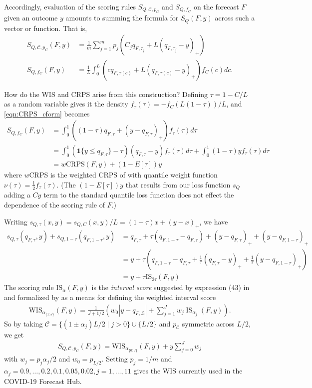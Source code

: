 \documentclass{article}
\begin{document}
Accordingly, evaluation of the scoring rules $S_{Q,\mathcal{C}, p_C}$ and $S_{Q,f_C}$ on the forecast $F$ given an outcome $y$ amounts to summing the formula for $S_Q(F,y)$ across such a vector or function. That is,
\begin{align}
S_{Q,\mathcal{C}, p_C}(F,y) &= \frac{1}{m}\sum_{j=1}^{m}p_j(C_j q_{F,\tau_j} + L(q_{F,\tau_j} - y)_+) \\
S_{Q, f_C}(F,y) &= \frac{1}{L}\int_{0}^{L}(cq_{F,\tau(c)} + L(q_{F,\tau(c)} - y)_+) f_C(c)dc. \label{eqn:CRPS_cform}
\end{align}

How do the WIS and CRPS arise from this construction? Defining $\tau = 1-C/L$ as a random variable gives it the density 
$f_{\tau}(\tau) = -f_C\left(L(1-\tau)\right)/L$, 
and \eqref{eqn:CRPS_cform} becomes 
\begin{align}
S_{Q, f_C}(F,y) &= \int_{0}^{1}((1-\tau)q_{F,\tau} + (y-q_{F,\tau})_{+})f_{\tau}(\tau)d\tau \\
&= \int_{0}^{1}(\mathbf{1}\{y \leq q_{F,\tau}\}-\tau)(q_{F,\tau} - y)f_{\tau}(\tau)d\tau + \int_{0}^{1}(1-\tau)y f_{\tau}(\tau)d\tau \\
&= w\mathrm{CRPS}(F,y) + (1-E[\tau])y
\end{align}
where $w$CRPS is the weighted CRPS of \cite{gneiting2011weightedScoringRules} with quantile weight function $\nu(\tau) = \frac{1}{2}f_{\tau}(\tau)$. 
(The $(1-E[\tau])y$ that results from our loss function $s_Q$ adding a $Cy$ term to the standard quantile loss function does not effect the dependence of the scoring rule of $F$.)

Writing $s_{Q,\tau}(x,y) = s_{Q,C}(x,y)/L = (1-\tau)x + (y-x)_{+}$, we have
\begin{align}
s_{Q,\tau}(q_{F,\tau},y) + s_{Q,1-\tau}(q_{F,1-\tau},y) &= q_{F,\tau} + \tau(q_{F,1-\tau} - q_{F,\tau}) + (y - q_{F,\tau})_{+} + (y - q_{F,1-\tau})_{+} \\
&= y + \tau\left(q_{F,1-\tau} - q_{F,\tau} + \frac{1}{\tau}(q_{F,\tau} - y)_{+} + \frac{1}{\tau}(y - q_{F,1-\tau})_{+}\right) \\
&= y + \tau \mathrm{IS}_{2\tau}(F,y)
\end{align}
The scoring rule $\mathrm{IS}_{\alpha}(F,y)$ is the \emph{interval score} suggested by expression (43) in \cite{gneiting2007strictly} 
and formalized by \cite{bracher2021evaluating} as a means for defining the weighted interval score 
\begin{align}
\mathrm{WIS}_{\alpha_{\{1: J\}}}(F, y)=\frac{1}{J+1 / 2}\left(w_0 |y-q_{F,.5}|+\sum_{j=1}^J w_j \operatorname{IS}_{\alpha_j}(F, y)\right).
\end{align}
So by taking $\mathcal{C} = \{(1 \pm \alpha_j)L/2 \mid j > 0\}\cup \{L/2\}$ and $p_\mathcal{C}$ symmetric across $L/2$, we get 
\begin{align}	
S_{Q,\mathcal{C}, p_C}(F,y) = \mathrm{WIS}_{\alpha_{\{0: J\}}}(F, y) + y \sum_{j=0}^{J} w_j
\end{align}	
with $w_j = p_{j}\alpha_j/2$ and $w_0 = p_{L/2}$. Setting $p_j=1/m$ and $\alpha_j=0.9, \ldots, 0.2,0.1,0.05,0.02, j = 1,\ldots,11$ gives the WIS currently used in 
the COVID-19 Forecast Hub.
\end{document}
